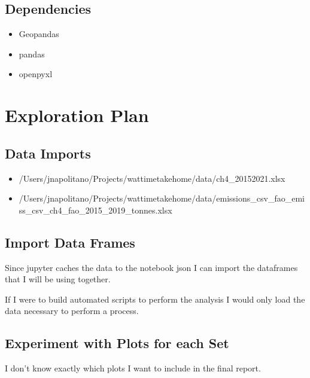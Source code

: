 \documentclass[letterpaper,10pt,english]{jupyterBook}
\begin{document}
\subsection{Dependencies}
\label{\detokenize{notebooks/data_exploration:dependencies}}\begin{itemize}
\item {} 
\sphinxAtStartPar
Geopandas

\item {} 
\sphinxAtStartPar
pandas

\item {} 
\sphinxAtStartPar
openpyxl

\end{itemize}


\section{Exploration Plan}
\label{\detokenize{notebooks/data_exploration:exploration-plan}}

\subsection{Data Imports}
\label{\detokenize{notebooks/data_exploration:data-imports}}\begin{itemize}
\item {} 
\sphinxAtStartPar
/Users/jnapolitano/Projects/wattime\sphinxhyphen{}takehome/data/ch4\_2015\sphinxhyphen{}2021.xlsx

\item {} 
\sphinxAtStartPar
/Users/jnapolitano/Projects/wattime\sphinxhyphen{}takehome/data/emissions\_csv\_fao\_emiss\_csv\_ch4\_fao\_2015\_2019\_tonnes.xlsx

\end{itemize}


\subsection{Import Data Frames}
\label{\detokenize{notebooks/data_exploration:import-data-frames}}
\sphinxAtStartPar
Since jupyter caches the data to the notebook json I can import the dataframes that I will be using together.

\sphinxAtStartPar
If I were to build automated scripts to perform the analysis I would only load the data necessary to perform a process.


\subsection{Experiment with Plots for each Set}
\label{\detokenize{notebooks/data_exploration:experiment-with-plots-for-each-set}}
\sphinxAtStartPar
I don’t know exactly which plots I want to include in the final report.
\end{document}
